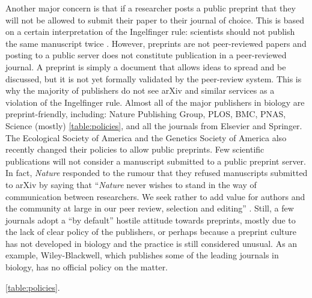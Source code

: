 \documentclass[letterpaper,twocolumn,superscriptaddress,showkeys,longbibliography]{revtex4-1}
\begin{document}
Another major concern is that if a researcher posts a public preprint that they
will not be allowed to submit their paper to their journal of choice. This is 
based on a certain interpretation
of the Ingelfinger rule: scientists should not publish the same manuscript twice
\cite{alt96}. However, preprints are not peer-reviewed papers and posting to a
public server does not constitute publication in a peer-reviewed journal.
A preprint is simply a document that allows ideas to spread and be discussed, 
but it is not yet formally validated by the peer-review system. This is why the
majority of publishers do not see arXiv and similar services as a violation of the
Ingelfinger rule. Almost all of the major publishers in biology are preprint-friendly,
including: Nature Publishing Group, PLOS, BMC, PNAS, Science (mostly) \ref{table:policies},
and all the journals from Elsevier %
and Springer.  The Ecological Society of America and the Genetics Society of
America also recently changed their policies to allow public preprints.  Few
scientific publications will not consider a manuscript submitted to a public
preprint server. In fact, \emph{Nature} responded to the rumour that they refused
manuscripts submitted to arXiv by saying that ``\emph{Nature} never wishes to
stand in the way of communication between researchers. We seek rather to add
value for authors and the community at large in our peer review, selection and
editing'' \cite{nat05}. Still, a few journals adopt a ``by default'' hostile attitude
towards preprints, mostly due to the lack of clear policy of the publishers, or
perhaps because a preprint culture has not developed in biology and the practice
is still considered unusual. As an example, Wiley-Blackwell, which publishes
some of the leading journals in biology, has no official policy on the matter.

\ref{table:policies}.
\end{document}
